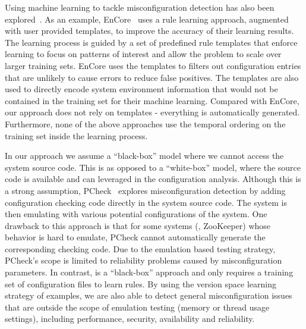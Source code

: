 Using machine learning to tackle misconfiguration detection has also been explored~\cite{yuan11context, zhang14encore, xu16early}.
As an example, EnCore~\cite{zhang14encore} uses a rule learning approach, augmented with user provided templates, to improve the accuracy of their learning results.
The learning process is guided by a set of predefined rule templates that enforce learning to focus on patterns of interest and allow the problem to scale over larger training sets.
EnCore uses the templates to filters out configuration entries that are unlikely to cause errors to reduce false positives.
The templates are also used to directly encode system environment information that would not be contained in the training set for their machine learning.
Compared with EnCore, our approach does not rely on templates - everything is automatically generated.
Furthermore, none of the above approaches use the temporal ordering on the training set inside the learning process.

In our approach we assume a ``black-box'' model where we cannot access the system source code.
This is as opposed to a ``white-box'' model, where the source code is available and can leveraged in the configuration analysis.
Although this is a strong assumption, PCheck~\cite{xu16early} explores misconfiguration detection by adding configuration checking code directly in the system source code.
The system is then emulating with various potential configurations of the system.
One drawback to this approach is that for some systems (\eg, ZooKeeper) whose behavior is hard to emulate, PCheck cannot automatically generate the corresponding checking code.
Due to the emulation based testing strategy, PCheck's scope is limited to reliability problems caused by misconfiguration parameters. 
In contrast, \app is a ``black-box'' approach and only requires a training set of configuration files to learn rules.
By using the version space learning strategy of examples, we are also able to detect general misconfiguration issues that are outside the scope of emulation testing (\eg memory or thread usage settings), including performance, security, availability and reliability.


\iffalse
\para{Misconfiguration diagnosis}
Misconfiguration diagnosis approaches have been proposed to address configuration problems post-mortem.
For example, ConfAid~\cite{attariyan10automating} 
and X-ray~\cite{attariyan12x-ray} use dynamic information
flow tracking to find possible configuration errors that may have resulted in
failures or performance problems. AutoBash~\cite{su07autobash} 
tracks causality and automatically fixes 
misconfigurations. Unlike \app, most misconfiguration
diagnosis efforts aim at finding errors after system
failures occur, which leads to prolonged recovery time.
\fi

